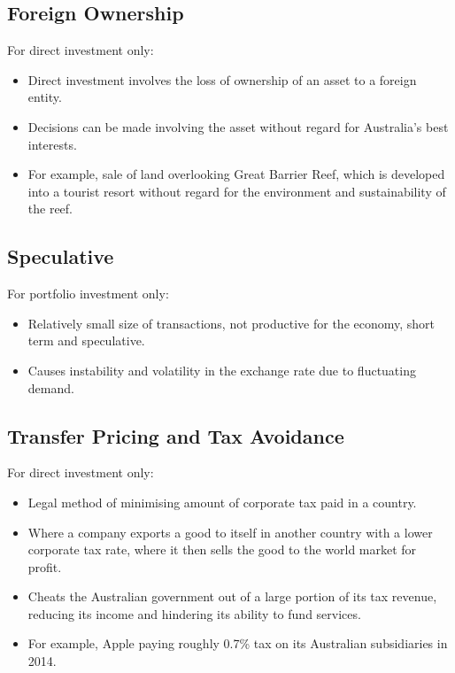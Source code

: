 \documentclass[a4paper,11pt]{report}
\begin{document}
\subsection{Foreign Ownership}

For direct investment only:

\begin{itemize}
\item Direct investment involves the loss of ownership of an asset to a foreign
	entity.
\item Decisions can be made involving the asset without regard for Australia's
	best interests.
\item For example, sale of land overlooking Great Barrier Reef, which is
	developed into a tourist resort without regard for the environment and
	sustainability of the reef.
\end{itemize}

\subsection{Speculative}

For portfolio investment only:

\begin{itemize}
\item Relatively small size of transactions, not productive for the economy,
	short term and speculative.
\item Causes instability and volatility in the exchange rate due to fluctuating
	demand.
\end{itemize}

\subsection{Transfer Pricing and Tax Avoidance}

For direct investment only:

\begin{itemize}
\item Legal method of minimising amount of corporate tax paid in a country.
\item Where a company exports a good to itself in another country with a lower
	corporate tax rate, where it then sells the good to the world market for
	profit.
\item Cheats the Australian government out of a large portion of its tax
	revenue, reducing its income and hindering its ability to fund services.
\item For example, Apple paying roughly 0.7\% tax on its Australian
	subsidiaries in 2014.
\end{itemize}
\end{document}

